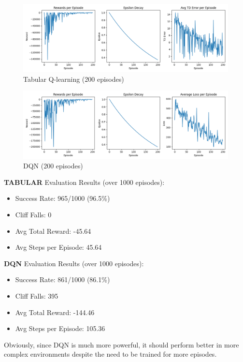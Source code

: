 \documentclass[a4paper,12pt]{article}
\begin{document}
\begin{figure}[H]
    \centering
    \includegraphics[width=\linewidth]{plot_tabular_200ep.png}
    \caption{Tabular Q-learning (200 episodes)}
\end{figure}
\begin{figure}[H]
    \centering
    \includegraphics[width=\linewidth]{plot_dqn200ep.png}
    \caption{DQN (200 episodes)}
\end{figure}
\noindent \textbf{TABULAR} Evaluation Results (over 1000 episodes):
\begin{itemize}
    \item Success Rate: 965/1000 (96.5\%)
    \item Cliff Falls: 0
    \item Avg Total Reward: -45.64
    \item Avg Steps per Episode: 45.64
\end{itemize}
\textbf{DQN} Evaluation Results (over 1000 episodes):
\begin{itemize}
    \item Success Rate: 861/1000 (86.1\%)
    \item Cliff Falls: 395
    \item Avg Total Reward: -144.46
    \item Avg Steps per Episode: 105.36
\end{itemize}

\noindent Obviously, since DQN is much more powerful, it should perform better in more complex environments despite the need to be trained for more episodes.
\end{document}
